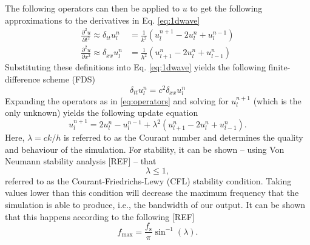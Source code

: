 \documentclass[preprint]{JASA}
\begin{document}
The following operators can then be applied to $u$ to get the following approximations to the derivatives in Eq. \eqref{eq:1dwave}
\begin{subequations}\label{eq:operators}
    \begin{align}
         \frac{\partial^2u}{\partial t^2} \approx \delta_{tt}u_l^n &= \frac{1}{k^2}\left(u_l^{n+1}-2u_l^n + u_l^{n-1}\right)\label{eq:secondOrderTime}\\
         \frac{\partial^2u}{\partial x^2} \approx \delta_{xx}u_l^n &= \frac{1}{h^2}\left(u_{l+1}^n-2u_l^n + u_{l-1}^n\right)\label{eq:secondOrderSpace}
    \end{align}
\end{subequations}
Substituting these definitions into Eq. \eqref{eq:1dwave} yields the following finite-difference scheme (FDS)
\begin{equation}
    \delta_{tt}u_l^n = c^2 \delta_{xx}u_l^n
\end{equation}
Expanding the operators as in %
\eqref{eq:operators} and solving for $u_l^{n+1}$ (which is the only unknown) yields the following update equation
\begin{equation}
    u_l^{n+1} = 2u_l^n-u_l^{n-1} + \lambda^2 \left(u_{l+1}^n-2u_l^n + u_{l-1}^n\right).
\end{equation}
Here, $\lambda = ck/h$ is referred to as the Courant number and determines the quality and behaviour of the simulation. For stability, it can be shown -- using Von Neumann stability analysis [REF] -- that \begin{equation}\label{eq:CFL}
    \lambda \leq 1,
\end{equation}
referred to as the Courant-Friedrichs-Lewy (CFL) stability condition. Taking values lower than this condition will decrease the maximum frequency that the simulation is able to produce, i.e., the bandwidth of our output. It can be shown that this happens according to the following [REF]
\begin{equation}
    f_\text{max} = \frac{f_\text{s}}{\pi} \sin^{-1}(\lambda).
\end{equation}

\begin{figure*}
\end{figure*}
\end{document}
